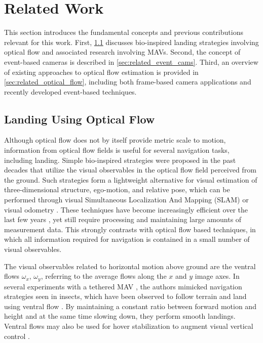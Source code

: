 \section{Related Work}
\label{sec:related}

This section introduces the fundamental concepts and previous contributions relevant for this work. First, \cref{sec:related_landing} discusses bio-inspired landing strategies involving optical flow and associated research involving MAVs. Second, the concept of event-based cameras is described in \cref{sec:related_event_cams}. Third, an overview of existing approaches to optical flow estimation is provided in \cref{sec:related_optical_flow}, including both frame-based camera applications and recently developed event-based techniques.

\subsection{Landing Using Optical Flow} 
\label{sec:related_landing}
Although optical flow does not by itself provide metric scale to motion, information from optical flow fields is useful for several navigation tasks, including landing. Simple bio-inspired strategies were proposed in the past decades that utilize the visual observables in the optical flow field perceived from the ground. Such strategies form a lightweight alternative for visual estimation of three-dimensional structure, ego-motion, and relative pose, which can be performed through visual Simultaneous Localization And Mapping (SLAM) \cite{Davison2007a} or visual odometry \cite{Nister2004}. These techniques have become increasingly efficient over the last few years \cite{Forster2014,Engel2014}, yet still require processing and maintaining large amounts of measurement data. This strongly contrasts with optical flow based techniques, in which all information required for navigation is contained in a small number of visual observables.

The visual observables related to horizontal motion above ground are the ventral flows $\omega_x$, $\omega_y$, referring to the average flows along the $x$ and $y$ image axes. In several experiments with a tethered MAV \cite{Ruffier2014,Expert2015}, the authors mimicked navigation strategies seen in insects, which have been observed to follow terrain and land using ventral flow \cite{Srinivasan1996}. By maintaining a constant ratio between forward motion and height and at the same time slowing down, they perform smooth landings. Ventral flows may also be used for hover stabilization to augment visual vertical control \cite{Alkowatly2015}.

